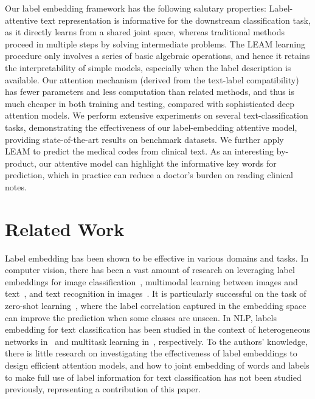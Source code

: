 \documentclass[11pt,a4paper]{article}
\begin{document}
Our label embedding framework has the following salutary properties:
 Label-attentive text representation is informative for the downstream classification task, as it directly learns from a shared joint space, whereas traditional methods proceed in multiple steps by solving intermediate problems.
  The LEAM learning procedure only involves a series of basic algebraic operations, and hence it retains the interpretability of simple models, especially when the label description is available.
 Our attention mechanism (derived from the text-label compatibility) has fewer parameters and less computation than related methods, and thus is much cheaper in both training and testing, compared with sophisticated deep attention models.
  We perform extensive experiments on several text-classification tasks, demonstrating the effectiveness of our label-embedding attentive model, providing state-of-the-art results on benchmark datasets.
 We further apply LEAM to predict the medical codes from clinical text. As an interesting by-product, our attentive model can highlight the informative key words for prediction, which in practice can reduce a doctor's burden on reading clinical notes.


\section{Related Work}
Label embedding has been shown to be effective in various domains and tasks.
In computer vision, there has been a vast amount of research on leveraging label embeddings for image classification~\citep{akata2016label}, multimodal learning between images and text~\citep{frome2013devise,kiros2014unifying}, and text recognition in images~\cite{rodriguez2013label}. It is particularly successful on the task of zero-shot learning~\cite{palatucci2009zero,yogatama2015embedding,ma2016label}, where the label correlation captured in the embedding space can improve the prediction when some classes are unseen.  
In NLP, labels embedding for text classification has been studied in the context of heterogeneous networks in~\citep{tang2015pte} and multitask learning in~\citep{zhang2017multi}, respectively.
To the authors' knowledge, there is little research on investigating the effectiveness of label embeddings to design efficient attention models, and how to joint embedding of words and labels to make full use of label information for text classification has not been studied previously, representing a contribution of this paper.
\end{document}
